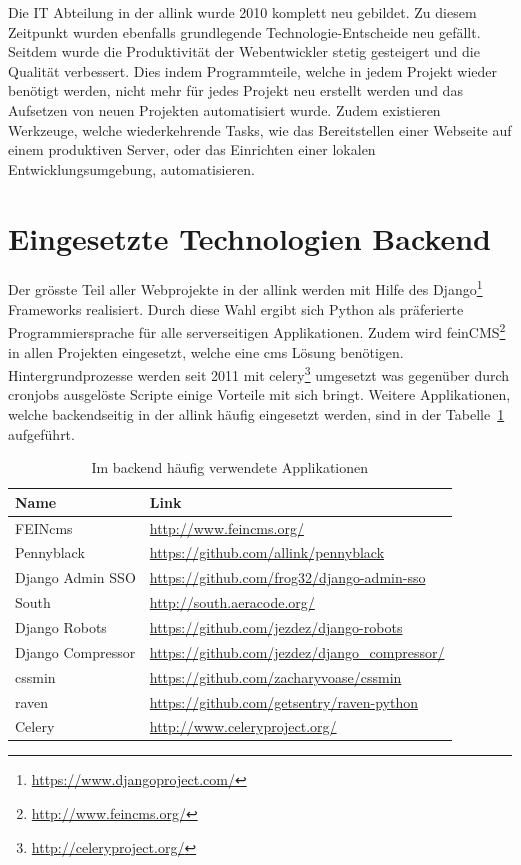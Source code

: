 
Die IT Abteilung in der allink wurde 2010 komplett neu gebildet. Zu diesem Zeitpunkt wurden ebenfalls grundlegende Technologie-Entscheide neu gefällt. Seitdem wurde die Produktivität der Webentwickler stetig gesteigert und die Qualität verbessert. Dies indem Programmteile, welche in jedem Projekt wieder benötigt werden, nicht mehr für jedes Projekt neu erstellt werden und das Aufsetzen von neuen Projekten automatisiert wurde. Zudem existieren Werkzeuge, welche wiederkehrende Tasks, wie das Bereitstellen einer Webseite auf einem produktiven Server, oder das Einrichten einer lokalen Entwicklungsumgebung, automatisieren.

\section{Eingesetzte Technologien Backend}
\label{sec:eingesetzte_technologien_backend}
Der grösste Teil aller Webprojekte in der allink werden mit Hilfe des Django\footnote{\url{https://www.djangoproject.com/}} Frameworks realisiert. Durch diese Wahl ergibt sich Python als präferierte Programmiersprache für alle serverseitigen Applikationen. Zudem wird feinCMS\footnote{\url{http://www.feincms.org/}} in allen Projekten eingesetzt, welche eine \acrshort{cms} Lösung benötigen. Hintergrundprozesse werden seit 2011 mit celery\footnote{\url{http://celeryproject.org/}} umgesetzt was gegenüber durch cronjobs ausgelöste Scripte einige Vorteile mit sich bringt. Weitere Applikationen, welche backendseitig in der allink häufig eingesetzt werden, sind in der Tabelle~\ref{tab:backend_applications} aufgeführt.

\begin{table}[ht]
  \centering
  \begin{tabular}{ll}
  \toprule
    \textbf{Name} & \textbf{Link}\\
  \midrule
    FEINcms & \url{http://www.feincms.org/}\\
  \midrule
    Pennyblack & \url{https://github.com/allink/pennyblack}\\
  \midrule
    Django Admin SSO & \url{https://github.com/frog32/django-admin-sso}\\
  \midrule
    South & \url{http://south.aeracode.org/}\\
  \midrule
    Django Robots & \url{https://github.com/jezdez/django-robots}\\
  \midrule
    Django Compressor & \url{https://github.com/jezdez/django_compressor/}\\
  \midrule
    cssmin & \url{https://github.com/zacharyvoase/cssmin}\\
  \midrule
    raven & \url{https://github.com/getsentry/raven-python}\\
  \midrule
    Celery & \url{http://www.celeryproject.org/}\\
  \bottomrule
  \end{tabular}
  \caption{Im backend häufig verwendete Applikationen}
  \label{tab:backend_applications}
\end{table}

